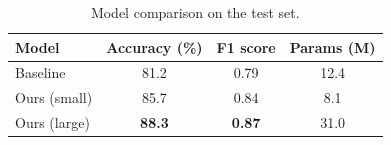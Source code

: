 \documentclass{article}
\begin{document}
\begin{table}[htbp]
  \centering
  \caption{Model comparison on the test set.}
  \label{tab:results}
  \begin{tabular}{@{}lccc@{}}
    \toprule
    Model        & Accuracy (\%) & F1 score      & Params (M) \\
    \midrule
    Baseline     & 81.2          & 0.79          & 12.4 \\
    Ours (small) & 85.7          & 0.84          & 8.1  \\
    Ours (large) & \textbf{88.3} & \textbf{0.87} & 31.0 \\
    \bottomrule
  \end{tabular}
\end{table}
\end{document}

